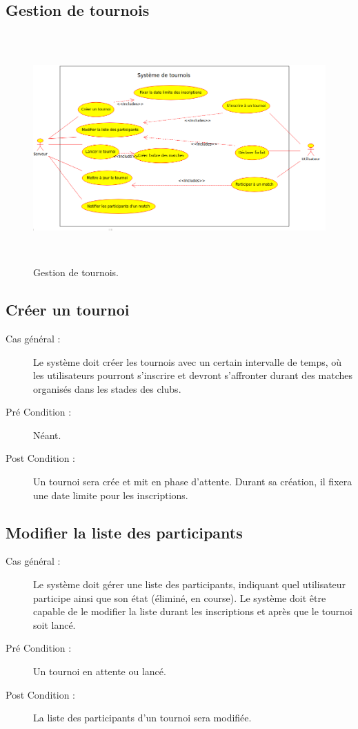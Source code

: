 \documentclass[a4paper]{report}
\begin{document}
\subsection{Gestion de tournois}
\begin{figure}[H]
    \caption{\label{1} Gestion de tournois.}
    \begin{center}
        \includegraphics[height=250pt]{uml/servTournoi.png}
    \end{center}
\end{figure}
\subsection{Créer un tournoi}
\begin{description}
    \item[Cas général :] Le système doit créer les tournois avec un certain intervalle de temps, où les \glspl{utilisateur} pourront s'inscrire et devront s'affronter durant des matches organisés dans les stades des \glspl{club}.
    \item[Pré Condition  :] Néant.
    \item[Post Condition :] Un tournoi sera crée et mit en phase d'attente.
        Durant sa création, il fixera une date limite pour les inscriptions.
\end{description}

\subsection{Modifier la liste des \glspl{participant}}
\begin{description}
    \item[Cas général :] Le système doit gérer une liste des \glspl{participant}, indiquant quel \gls{utilisateur} participe ainsi que son état (éliminé, en course). Le système doit être capable de le modifier la liste durant les inscriptions et après que le tournoi soit lancé.
    \item[Pré Condition  :] Un tournoi en attente ou lancé.
    \item[Post Condition :] La liste des \glspl{participant} d'un tournoi sera modifiée.
\end{description}
\end{document}
